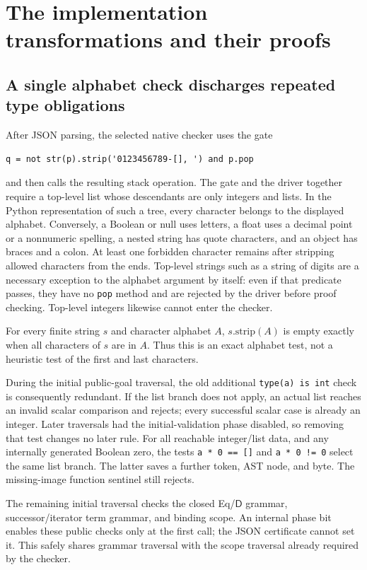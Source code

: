 \documentclass[11pt]{article}
\theoremstyle{definition}\newtheorem{definition}[theorem]{Definition}
\theoremstyle{remark}\newtheorem{remark}[theorem]{Remark}
\newcommand{\D}{\mathsf D}
\newcommand{\file}[1]{\nolinkurl{#1}}
\begin{document}
\section{The implementation transformations and their proofs}
\label{main:implementation}

\subsection{A single alphabet check discharges repeated type obligations}

After JSON parsing, the selected native checker uses the gate
\begin{lstlisting}
q = not str(p).strip('0123456789-[], ') and p.pop
\end{lstlisting}
and then calls the resulting stack operation. The gate and the driver
together require a top-level list whose descendants are only integers
and lists. In the Python representation of such a tree, every character
belongs to the displayed alphabet. Conversely, a Boolean or null uses
letters, a float uses a decimal point or a nonnumeric spelling, a nested
string has quote characters, and an object has braces and a colon. At
least one forbidden character remains after stripping allowed characters
from the ends. Top-level strings such as a string of digits are a
necessary exception to the alphabet argument by itself: even if that
predicate passes, they have no \file{pop} method and are rejected by the
driver before proof checking. Top-level integers likewise cannot enter
the checker.

For every finite string \(s\) and character alphabet \(A\),
\(s.\mathrm{strip}(A)\) is empty exactly when all characters of \(s\)
are in \(A\). Thus this is an exact alphabet test, not a heuristic test
of the first and last characters.

During the initial public-goal traversal, the old additional
\file{type(a) is int} check is consequently redundant. If the list branch
does not apply, an actual list reaches an invalid scalar comparison and
rejects; every successful scalar case is already an integer. Later
traversals had the initial-validation phase disabled, so removing that
test changes no later rule. For all reachable integer/list data, and any
internally generated Boolean zero, the tests
\file{a * 0 == []} and \file{a * 0 != 0} select the same list branch.
The latter saves a further token, AST node, and byte. The missing-image
function sentinel still rejects.

The remaining initial traversal checks the closed Eq/\(\D\) grammar,
successor/iterator term grammar, and binding scope. An internal phase bit
enables these public checks only at the first call; the JSON certificate
cannot set it. This safely shares grammar traversal with the scope
traversal already required by the checker.
\end{document}
